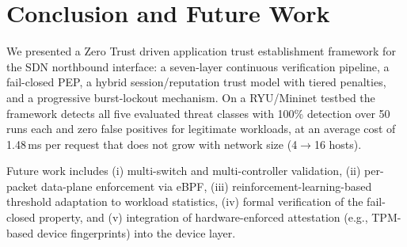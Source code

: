 \documentclass[journal]{IEEEtran}
\begin{document}
\section{Conclusion and Future Work}
We presented a Zero Trust driven application trust establishment framework for the SDN northbound interface: a seven-layer continuous verification pipeline, a fail-closed PEP, a hybrid session/reputation trust model with tiered penalties, and a progressive burst-lockout mechanism. On a RYU/Mininet testbed the framework detects all five evaluated threat classes with 100\% detection over 50 runs each and zero false positives for legitimate workloads, at an average cost of 1.48\,ms per request that does not grow with network size (4$\rightarrow$16 hosts).

Future work includes (i) multi-switch and multi-controller validation, (ii) per-packet data-plane enforcement via eBPF, (iii) reinforcement-learning-based threshold adaptation to workload statistics, (iv) formal verification of the fail-closed property, and (v) integration of hardware-enforced attestation (e.g., TPM-based device fingerprints) into the device layer.
\end{document}
